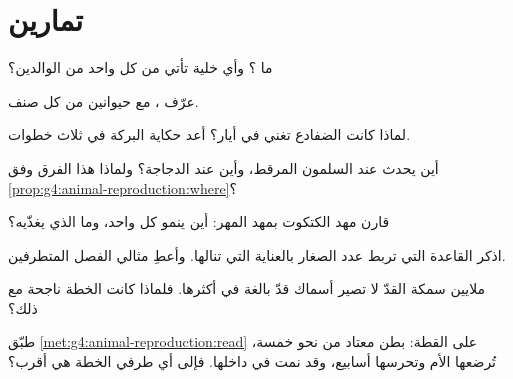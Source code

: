 \section{تمارين}

\begin{exercise}[$\star$]\label{exo:g4:animal-reproduction:1}
ما ؟ وأي خلية تأتي من كل واحد من الوالدين؟
\end{exercise}

\begin{exercise}[$\star$]\label{exo:g4:animal-reproduction:2}
عرّف  ، مع حيوانين من كل صنف.
\end{exercise}

\begin{exercise}[$\star$]\label{exo:g4:animal-reproduction:3}
لماذا كانت الضفادع تغني في أيار؟ أعد حكاية البركة في ثلاث خطوات.
\end{exercise}

\begin{exercise}[$\star$]\label{exo:g4:animal-reproduction:4}
أين يحدث  عند السلمون المرقط، وأين عند الدجاجة؟ ولماذا هذا
الفرق وفق \cref{prop:g4:animal-reproduction:where}؟
\end{exercise}

\begin{exercise}[$\star$]\label{exo:g4:animal-reproduction:5}
قارن مهد الكتكوت بمهد المهر: أين ينمو كل واحد، وما الذي يغذّيه؟
\end{exercise}

\begin{exercise}[$\star$]\label{exo:g4:animal-reproduction:6}
اذكر القاعدة التي تربط عدد الصغار بالعناية التي تنالها. وأعطِ
مثالي الفصل المتطرفين.
\end{exercise}

\begin{exercise}[$\star$]\label{exo:g4:animal-reproduction:7}
ملايين  سمكة القدّ لا تصير أسماك قدّ بالغة في أكثرها. فلماذا
كانت الخطة ناجحة مع ذلك؟
\end{exercise}

\begin{exercise}[$\star$]\label{exo:g4:animal-reproduction:8}
طبّق \cref{met:g4:animal-reproduction:read} على القطة: بطن معتاد
من نحو خمسة، تُرضعها الأم وتحرسها أسابيع، وقد نمت في داخلها. فإلى
أي طرفي الخطة هي أقرب؟
\end{exercise}

